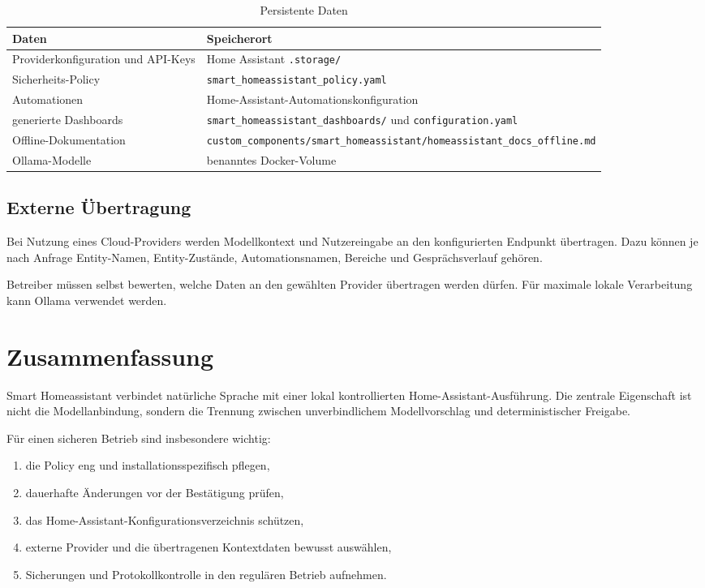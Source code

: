 \documentclass[
  11pt,
  a4paper,
  oneside,
  parskip=half
]{scrreprt}
\newcommand{\code}[1]{\texttt{#1}}
\begin{document}
\begin{table}[htbp]
  \centering
  \begin{tabularx}{\textwidth}{@{}L{49mm}Y@{}}
    \toprule
    \textbf{Daten} & \textbf{Speicherort} \\
    \midrule
    Providerkonfiguration und API-Keys & Home Assistant \code{.storage/} \\
    Sicherheits-Policy & \code{smart\_homeassistant\_policy.yaml} \\
    Automationen & Home-Assistant-Automationskonfiguration \\
    generierte Dashboards & \code{smart\_homeassistant\_dashboards/} und
    \code{configuration.yaml} \\
    Offline-Dokumentation &
    \code{custom\_components/smart\_homeassistant/homeassistant\_docs\_offline.md} \\
    Ollama-Modelle & benanntes Docker-Volume \\
    \bottomrule
  \end{tabularx}
  \caption{Persistente Daten}
\end{table}

\section{Externe Übertragung}

Bei Nutzung eines Cloud-Providers werden Modellkontext und Nutzereingabe an den
konfigurierten Endpunkt übertragen. Dazu können je nach Anfrage Entity-Namen,
Entity-Zustände, Automationsnamen, Bereiche und Gesprächsverlauf gehören.

Betreiber müssen selbst bewerten, welche Daten an den gewählten Provider übertragen
werden dürfen. Für maximale lokale Verarbeitung kann Ollama verwendet werden.

\chapter{Zusammenfassung}

Smart Homeassistant verbindet natürliche Sprache mit einer lokal kontrollierten
Home-Assistant-Ausführung. Die zentrale Eigenschaft ist nicht die Modellanbindung,
sondern die Trennung zwischen unverbindlichem Modellvorschlag und deterministischer
Freigabe.

Für einen sicheren Betrieb sind insbesondere wichtig:

\begin{enumerate}
  \item die Policy eng und installationsspezifisch pflegen,
  \item dauerhafte Änderungen vor der Bestätigung prüfen,
  \item das Home-Assistant-Konfigurationsverzeichnis schützen,
  \item externe Provider und die übertragenen Kontextdaten bewusst auswählen,
  \item Sicherungen und Protokollkontrolle in den regulären Betrieb aufnehmen.
\end{enumerate}
\end{document}
